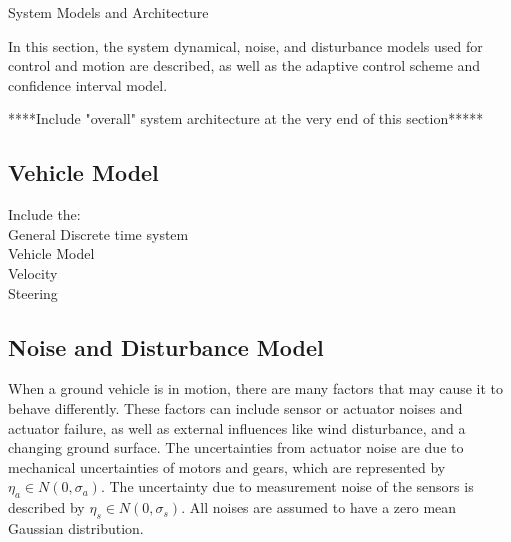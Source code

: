 \begin{section}{System Models and Architecture}
	
\label{sec:modeling}
In this section, the system dynamical, noise, and disturbance models used for control and motion are described, as well as the adaptive control scheme and confidence interval model.


****Include "overall" system architecture at the very end of this section*****

\subsection{Vehicle Model}
Include the:\\
General Discrete time system \\
Vehicle Model\\
Velocity\\
Steering\\

 \subsection{Noise and Disturbance Model}
When a ground vehicle is in motion, there are many factors that may cause it to behave differently. These factors can include sensor or actuator noises and actuator failure, as well as external influences like wind disturbance, and a changing ground surface. The uncertainties from actuator noise are due to mechanical uncertainties of motors and gears, which are represented by $ \eta_a \in N(0,\sigma_a) $. The uncertainty due to measurement noise of the sensors is described by $ \eta_s \in N(0,\sigma_s) $. All noises are assumed to have a zero mean Gaussian distribution.



\end{section}
